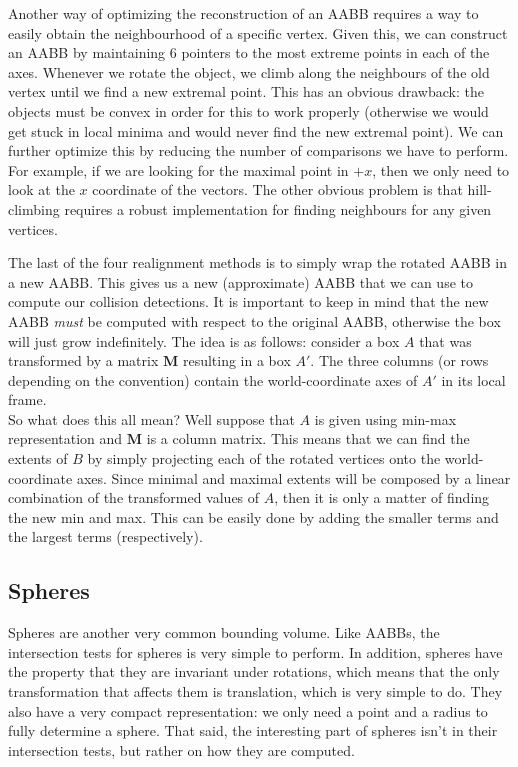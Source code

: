 \documentclass[11pt, letterpaper, oneside]{article}
\begin{document}
        Another way of optimizing the reconstruction of an AABB requires a way
        to easily obtain the neighbourhood of a specific vertex. Given this, we
        can construct an AABB by maintaining 6 pointers to the most extreme
        points in each of the axes. Whenever we rotate the object, we climb
        along the neighbours of the old vertex until we find a new extremal
        point. This has an obvious drawback: the objects must be convex in order
        for this to work properly (otherwise we would get stuck in local minima
        and would never find the new extremal point). We can further optimize
        this by reducing the number of comparisons we have to perform. For
        example, if we are looking for the maximal point in $+x$, then we only
        need to look at the $x$ coordinate of the vectors. The other obvious
        problem is that hill-climbing requires a robust implementation for
        finding neighbours for any given vertices.

        The last of the four realignment methods is to simply wrap the rotated
        AABB in a new AABB. This gives us a new (approximate) AABB that we can
        use to compute our collision detections. It is important to keep in mind
        that the new AABB \emph{must} be computed with respect to the original
        AABB, otherwise the box will just grow indefinitely.
        The idea is as follows: consider a box $A$ that was transformed by a
        matrix $\mathbf{M}$ resulting in a box $A'$. The three columns (or rows
        depending on the convention) contain the world-coordinate axes of $A'$
        in its local frame. \\
        So what does this all mean? Well suppose that $A$ is given using min-max
        representation and $\mathbf{M}$ is a column matrix. This means that we
        can find the extents of $B$ by simply projecting each of the rotated
        vertices onto the world-coordinate axes. Since minimal and maximal
        extents will be composed by a linear combination of the transformed
        values of $A$, then it is only a matter of finding the new min and max.
        This can be easily done by adding the smaller terms and the largest
        terms (respectively).

      \subsection{Spheres}
        Spheres are another very common bounding volume. Like AABBs, the
        intersection tests for spheres is very simple to perform. In addition,
        spheres have the property that they are invariant under rotations, which
        means that the only transformation that affects them is translation,
        which is very simple to do. They also have a very compact
        representation: we only need a point and a radius to fully determine a
        sphere. That said, the interesting part of spheres isn't in their
        intersection tests, but rather on how they are computed.
\end{document}
